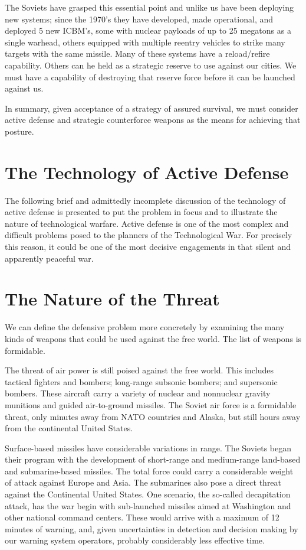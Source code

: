 The Soviets have grasped this essential point and unlike us have been deploying new systems; since the 1970's they have developed, made operational, and deployed 5 new ICBM's, some with nuclear payloads of up to 25 megatons as a single warhead, others equipped with multiple reentry vehicles to strike many targets with the same missile. Many of these systems have a reload/refire capability. Others can he held as a strategic reserve to use against our cities. We must have a capability of destroying that reserve force before it can be launched against us.

In summary, given acceptance of a strategy of assured survival, we must consider active defense and strategic counterforce weapons as the means for achieving that posture.

\section{The Technology of Active Defense}
The following brief and admittedly incomplete discussion of the technology of active defense is presented to put the problem in focus and to illustrate the nature of technological warfare. Active defense is one of the most complex and difficult problems posed to the planners of the Technological War. For precisely this reason, it could be one of the most decisive engagements in that silent and apparently peaceful war.

\section{The Nature of the Threat}
We can define the defensive problem more concretely by examining the many kinds of weapons that could be used against the free world. The list of weapons is formidable.

The threat of air power is still poised against the free world. This includes tactical fighters and bombers; long-range subsonic bombers; and supersonic bombers. These aircraft carry a variety of nuclear and nonnuclear gravity munitions and guided air-to-ground missiles. The Soviet air force is a formidable threat, only minutes away from NATO countries and Alaska, but still hours away from the continental United States.

Surface-based missiles have considerable variations in range. The Soviets began their program with the development of short-range and medium-range land-based and submarine-based missiles. The total force could carry a considerable weight of attack against Europe and Asia. The submarines also pose a direct threat against the Continental United States. One scenario, the so-called decapitation attack, has the war begin with sub-launched missiles aimed at Washington and other national command centers. These would arrive with a maximum of 12 minutes of warning, and, given uncertainties in detection and decision making by our warning system operators, probably considerably less effective time.


